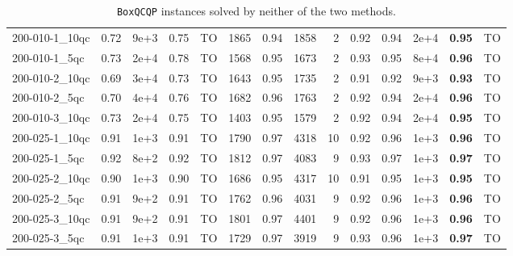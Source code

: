 \documentclass[twoside]{article}
\begin{document}
\begin{table}[h]
{\begin{tabular}{l|rccr|rcrrccrcr}
				200-010-1\_10qc & 0.72 & 9e+3 & 0.75 & TO & 1865 & 0.94 & 1858 & 2 & 0.92 & 0.94 & 2e+4 & \textbf{0.95} & TO \\
				200-010-1\_5qc & 0.73 & 2e+4 & 0.78 & TO & 1568 & 0.95 & 1673 & 2 & 0.93 & 0.95 & 8e+4 & \textbf{0.96} & TO \\
				200-010-2\_10qc & 0.69 & 3e+4 & 0.73 & TO & 1643 & 0.95 & 1735 & 2 & 0.91 & 0.92 & 9e+3 & \textbf{0.93} & TO \\
				200-010-2\_5qc & 0.70 & 4e+4 & 0.76 & TO & 1682 & 0.96 & 1763 & 2 & 0.92 & 0.94 & 2e+4 & \textbf{0.96} & TO \\
				200-010-3\_10qc & 0.73 & 2e+4 & 0.75 & TO & 1403 & 0.95 & 1579 & 2 & 0.92 & 0.94 & 2e+4 & \textbf{0.95} & TO \\
				200-025-1\_10qc & 0.91 & 1e+3 & 0.91 & TO & 1790 & 0.97 & 4318 & 10 & 0.92 & 0.96 & 1e+3 & \textbf{0.96} & TO \\
				200-025-1\_5qc & 0.92 & 8e+2 & 0.92 & TO & 1812 & 0.97 & 4083 & 9 & 0.93 & 0.97 & 1e+3 & \textbf{0.97} & TO \\
				200-025-2\_10qc & 0.90 & 1e+3 & 0.90 & TO & 1686 & 0.95 & 4317 & 10 & 0.91 & 0.95 & 1e+3 & \textbf{0.95} & TO \\
				200-025-2\_5qc & 0.91 & 9e+2 & 0.91 & TO & 1762 & 0.96 & 4031 & 9 & 0.92 & 0.96 & 1e+3 & \textbf{0.96} & TO \\
				200-025-3\_10qc & 0.91 & 9e+2 & 0.91 & TO & 1801 & 0.97 & 4401 & 9 & 0.92 & 0.96 & 1e+3 & \textbf{0.96} & TO \\
				200-025-3\_5qc & 0.91 & 1e+3 & 0.91 & TO & 1729 & 0.97 & 3919 & 9 & 0.93 & 0.96 & 1e+3 & \textbf{0.97} & TO \\
				\bottomrule
			\end{tabular}
		}
		\caption{\texttt{BoxQCQP} instances solved by neither of the two methods.}\label{tableUnsolvedBoxQP}
	\end{table}
	
	
\end{document}
